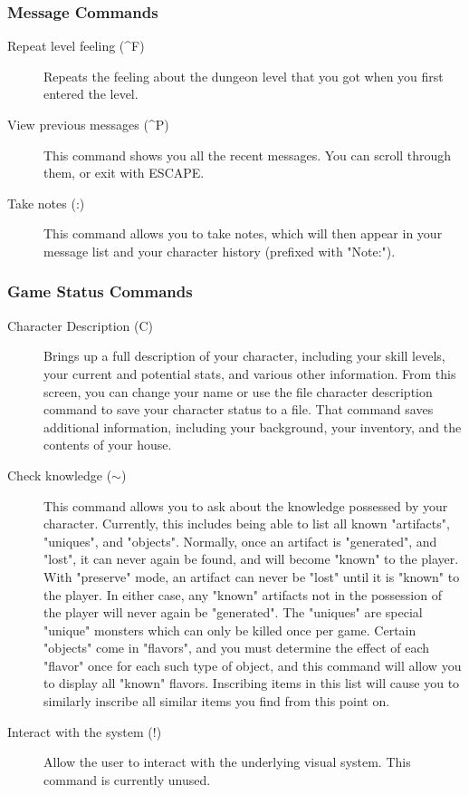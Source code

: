 \subsubsection{Message Commands} 
\begin{description}
\item[Repeat level feeling (\^{}F)]
  Repeats the feeling about the dungeon level that you got when you first
  entered the level.

\item[View previous messages (\^{}P)]
  This command shows you all the recent messages. You can scroll through
  them, or exit with ESCAPE.

\item[Take notes (:)]
  This command allows you to take notes, which will then appear in your
  message list and your character history (prefixed with "Note:").
\end{description}

\subsubsection{Game Status Commands} 
\begin{description}
\item[Character Description (C)]
  Brings up a full description of your character, including your skill
  levels, your current and potential stats, and various other information.
  From this screen, you can change your name or use the file character
  description command to save your character status to a file. That
  command saves additional information, including your background, your
  inventory, and the contents of your house.

\item[Check knowledge ($\sim$)]
  This command allows you to ask about the knowledge possessed by your
  character. Currently, this includes being able to list all known
  "artifacts", "uniques", and "objects". Normally, once an artifact is
  "generated", and "lost", it can never again be found, and will become
  "known" to the player. With "preserve" mode, an artifact can never be
  "lost" until it is "known" to the player.  In either case, any "known"
  artifacts not in the possession of the player will never again be
  "generated". The "uniques" are special "unique" monsters which can only
  be killed once per game.  Certain "objects" come in "flavors", and you
  must determine the effect of each "flavor" once for each such type of
  object, and this command will allow you to display all "known" flavors.
  Inscribing items in this list will cause you to similarly inscribe all
  similar items you find from this point on.

\item[Interact with the system (!)]
  Allow the user to interact with the underlying visual system.  This
  command is currently unused.
\end{description}


